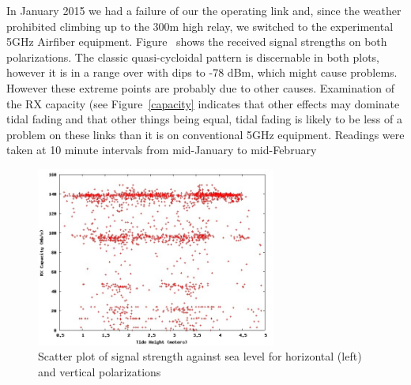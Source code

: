 In January 2015 we had a failure of our the operating link and, since
the weather prohibited climbing up to the 300m high relay, we switched
to the experimental 5GHz Airfiber equipment.
Figure~\label{fig:rxpower} shows the received signal strengths on both
polarizations.  The classic quasi-cycloidal pattern is discernable in
both plots, however it is in a range over with dips to -78 dBm, which
might cause problems.  However these extreme points are probably due
to other causes. Examination of the RX capacity (see
Figure~\ref{capacity} indicates that other effects may dominate tidal
fading and that other things being equal, tidal fading is likely to be
less of a problem on these links than it is on conventional 5GHz
equipment. Readings were taken at 10 minute intervals from mid-January
to mid-February
\begin{figure}
\includegraphics[width=0.7\textwidth]{tidedata/rxcapacity.jpg}
\caption{Scatter plot of signal strength against sea level for
  horizontal (left) and vertical  polarizations}
\label{fig:capacity}
\end{figure}

